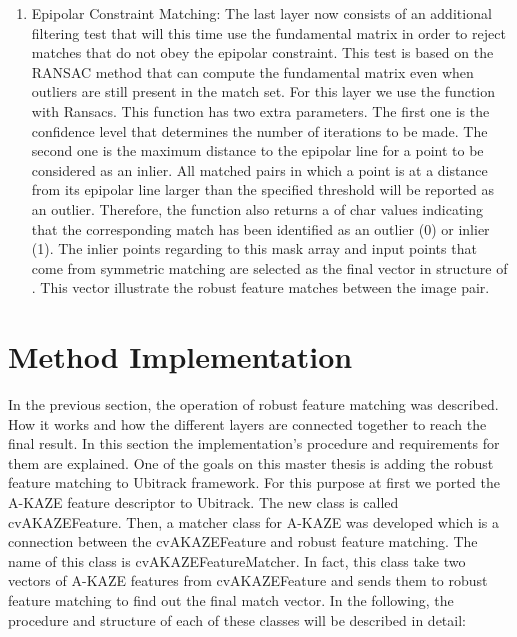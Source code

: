 \begin {enumerate}
  \item Epipolar Constraint Matching: The last layer now consists of an additional filtering test that will this time use the fundamental matrix in order to reject matches that do not obey the epipolar constraint. This test is based on the RANSAC method that can compute the fundamental matrix even when outliers are still present in the match set. For this layer we use the  function with Ransacs. This function has two extra parameters. The first one is the confidence level that determines the number of iterations to be made. The second one is the maximum distance to the epipolar line for a point to be considered as an inlier. All matched pairs in which a point is at a distance from its epipolar line larger than the specified threshold will be reported as an outlier. Therefore, the function also returns a  of char values indicating that the corresponding match has been identified as an outlier (0) or inlier (1). The inlier points regarding to this mask array and input points that come from symmetric matching are selected as the final vector in structure of . This vector illustrate the robust feature matches between the image pair.
\end {enumerate}

\section {Method Implementation}
In the previous section, the operation of robust feature matching was described. How it works and how the different layers are connected together to reach the final result. In this section the implementation's procedure and requirements for them are explained. One of the goals on this master thesis is adding the robust feature matching to Ubitrack framework. For this purpose at first we ported the A-KAZE feature descriptor to Ubitrack. The new class is called cvAKAZEFeature. Then, a matcher class for A-KAZE was developed which is a connection between the cvAKAZEFeature and robust feature matching. The name of this class is cvAKAZEFeatureMatcher. In fact, this class take two vectors of A-KAZE features from cvAKAZEFeature and sends them to robust feature matching to find out the final match vector. In the following, the procedure and structure of each of these classes will be described in detail:

